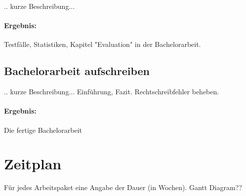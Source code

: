 \documentclass[a4paper]{article}
\begin{document}
.. kurze Beschreibung...

\paragraph{Ergebnis:}
Testfälle, Statistiken,
Kapitel "Evaluation" in der Bachelorarbeit.

\subsection{Bachelorarbeit aufschreiben}

.. kurze Beschreibung...
Einführung, Fazit. Rechtschreibfehler beheben.

\paragraph{Ergebnis:}
Die fertige Bachelorarbeit


\section{Zeitplan}

Für jedes Arbeitspaket eine Angabe der Dauer (in Wochen).
Gantt Diagram??




\end{document}
